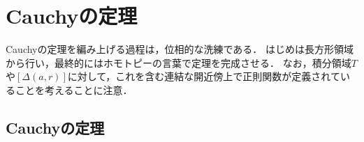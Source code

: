 \documentclass[uplatex, dvipdfmx]{jsreport}
\begin{document}
\section{Cauchyの定理}

\begin{tcolorbox}[colframe=ForestGreen, colback=ForestGreen!10!white,breakable,colbacktitle=ForestGreen!40!white,coltitle=black,fonttitle=\bfseries\sffamily,
title=]
    Cauchyの定理を編み上げる過程は，位相的な洗練である．
    はじめは長方形領域から行い，最終的にはホモトピーの言葉で定理を完成させる．
    なお，積分領域$T$や$[\Delta(a,r)]$に対して，これを含む連結な開近傍上で正則関数が定義されていることを考えることに注意．
\end{tcolorbox}

\subsection{Cauchyの定理}
\end{document}
